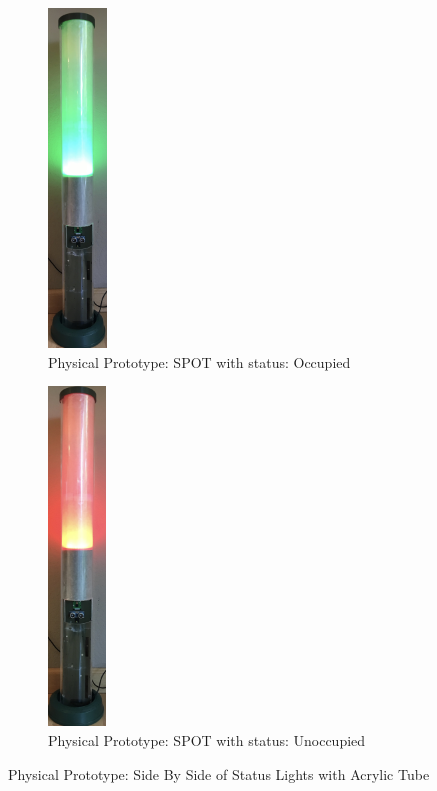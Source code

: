 \begin{figure}
\centering
\begin{subfigure}{.4\textwidth}
  \centering
  \includegraphics[width=.25\linewidth,height=9cm]{pictures/fullsizeoutput_14d.jpeg}
  \caption{Physical Prototype: SPOT with status: Occupied}
  \label{fig:3dprintedassembly}
\end{subfigure}%
\hfill
\begin{subfigure}{.4\textwidth}
  \centering
  \includegraphics[width=.25\linewidth,height=9cm]{pictures/fullsizeoutput_14f.jpeg}
  \caption{Physical Prototype: SPOT with status: Unoccupied}
  \label{fig:acrylictubefullassembly}
\end{subfigure}
\caption{Physical Prototype: Side By Side of Status Lights with Acrylic Tube}
\label{fig:finalassembly}
\end{figure}
